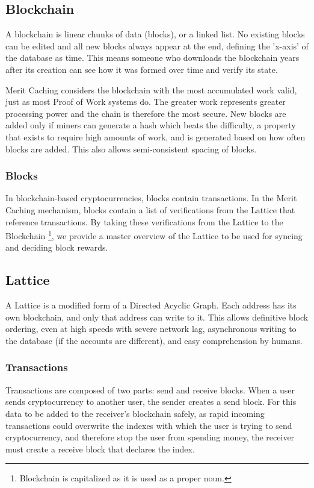 \documentclass[14pt]{article}
\begin{document}
\label{sec:1.1}
\subsection{Blockchain}
A blockchain is linear chunks of data (blocks), or a linked list. No existing blocks can be edited and all new blocks always appear at the end, defining the 'x-axis' of the database as time. This means someone who downloads the blockchain years after its creation can see how it was formed over time and verify its state. 

Merit Caching considers the blockchain with the most accumulated work valid, just as most Proof of Work systems do. The greater work represents greater processing power and the chain is therefore the most secure. New blocks are added only if miners can generate a hash which beats the difficulty, a property that exists to require high amounts of work, and is generated based on how often blocks are added. This also allows semi-consistent spacing of blocks.

\label{sec:1.1.1}
\subsubsection{Blocks}
In blockchain-based cryptocurrencies, blocks contain transactions. In the Merit Caching mechanism, blocks contain a list of verifications from the Lattice that reference transactions. By taking these verifications from the Lattice to the Blockchain \footnote{Blockchain is capitalized as it is used as a proper noun.}, we provide a master overview of the Lattice to be used for syncing and deciding block rewards.

\label{sec:1.2}
\subsection{Lattice}
A Lattice is a modified form of a Directed Acyclic Graph. Each address has its own blockchain, and only that address can write to it. This allows definitive block ordering, even at high speeds with severe network lag, asynchronous writing to the database (if the accounts are different), and easy comprehension by humans.

\label{sec:1.2.1}
\subsubsection{Transactions}
Transactions are composed of two parts: send and receive blocks. When a user sends cryptocurrency to another user, the sender creates a send block. For this data to be added to the receiver's blockchain safely, as rapid incoming transactions could overwrite the indexes with which the user is trying to send cryptocurrency, and therefore stop the user from spending money, the receiver must create a receive block that declares the index.
\end{document}
